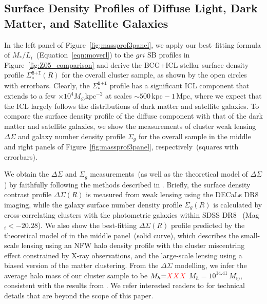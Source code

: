 \documentclass[fleqn,usenatbib]{mnras}
\newcommand{\sigbi}{\Sigma_*^{\texttt{B+I}}}
\newcommand{\sigg}{\Sigma_g}
\newcommand{\mh}{M_h}
\newcommand{\mpc}{\mathrm{Mpc}}
\newcommand{\kpc}{\mathrm{kpc}}
\newcommand{\msol}{M_{\odot}}
\newcommand{\ds}{\Delta\Sigma}
\newcommand*\xxx{{\color{red}XXX}}
\newcommand\xkchen[1]{{\color{cyan} {#1}}}
\begin{document}
\subsection{Surface Density Profiles of Diffuse Light, Dark Matter, and Satellite Galaxies}
\label{subsec:sigmathree}

In the left panel of Figure~\ref{fig:massprof3panel}, we apply our
best--fitting formula of $M_*/L_i$~(Equation~\ref{eqn:moverl}) to the $gri$
SB profiles in Figure~\ref{fig:Z05_comparison} and derive the BCG+ICL
stellar surface density profile $\sigbi(R)$ for the overall cluster sample,
as shown by the open circles with errorbars. Clearly, the $\sigbi$ profile
has a significant ICL component that extends to a few ${\times}10^4
\msol\kpc^{-2}$ at scales ${\sim}500\,\kpc{-}1\,\mpc$, where we expect that
the ICL largely follows the distributions of dark matter and satellite
galaxies. To compare the surface density profile of the diffuse component
with that of the dark matter and satellite galaxies, we show the
measurements of cluster weak lensing $\ds$ and galaxy number density
profile $\sigg$ for
the overall sample in the middle and right panels of
Figure~\ref{fig:massprof3panel}, respectively~(squares with errorbars).


We obtain the $\ds$ and $\sigg$ measurements~(as well as the theoretical
model of $\ds$) by faithfully following the methods described in
.  Briefly, the surface density contrast profile
$\ds(R)$ is measured from weak lensing using the DECaLs DR8 imaging, while
the galaxy surface number density profile $\sigg(R)$ is calculated by
cross-correlating clusters with the photometric galaxies within SDSS
DR8~\xkchen{(Mag$_i{<}-20.28$)}. We also show the best-fitting $\ds(R)$ profile
predicted by the theoretical model of  in the middle
panel~(solid curve), which describes the small-scale lensing using an NFW
halo density profile with the cluster miscentring effect constrained by
X-ray observations, and the large-scale lensing using a biased version of
the matter clustering. From the $\ds$ modelling, we infer the average halo
mass of our cluster sample to be $\mh{=}\xxx$\xkchen{$\mh{=}10^{14.41}\,\msol$}, consistent with the results
from .  We refer interested readers to
 for technical details that are beyond the scope of this
paper.
\end{document}
